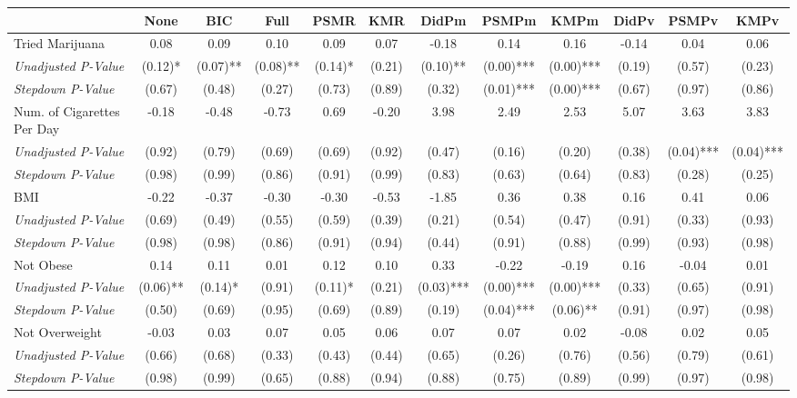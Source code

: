 \begin{tabular}{l c c c c c c c c c c c}
\toprule
 & None & BIC & Full & PSMR & KMR & DidPm & PSMPm & KMPm & DidPv & PSMPv & KMPv \\
\midrule
Tried Marijuana & 0.08 & 0.09 & 0.10 & 0.09 & 0.07 & -0.18 & 0.14 & 0.16 & -0.14 & 0.04 & 0.06 \\
\quad \textit{Unadjusted P-Value} & (0.12)* & (0.07)** & (0.08)** & (0.14)* & (0.21) & (0.10)** & (0.00)*** & (0.00)*** & (0.19) & (0.57) & (0.23) \\
\quad \textit{Stepdown P-Value} & (0.67) & (0.48) & (0.27) & (0.73) & (0.89) & (0.32) & (0.01)*** & (0.00)*** & (0.67) & (0.97) & (0.86) \\
Num. of Cigarettes Per Day & -0.18 & -0.48 & -0.73 & 0.69 & -0.20 & 3.98 & 2.49 & 2.53 & 5.07 & 3.63 & 3.83 \\
\quad \textit{Unadjusted P-Value} & (0.92) & (0.79) & (0.69) & (0.69) & (0.92) & (0.47) & (0.16) & (0.20) & (0.38) & (0.04)*** & (0.04)*** \\
\quad \textit{Stepdown P-Value} & (0.98) & (0.99) & (0.86) & (0.91) & (0.99) & (0.83) & (0.63) & (0.64) & (0.83) & (0.28) & (0.25) \\
BMI & -0.22 & -0.37 & -0.30 & -0.30 & -0.53 & -1.85 & 0.36 & 0.38 & 0.16 & 0.41 & 0.06 \\
\quad \textit{Unadjusted P-Value} & (0.69) & (0.49) & (0.55) & (0.59) & (0.39) & (0.21) & (0.54) & (0.47) & (0.91) & (0.33) & (0.93) \\
\quad \textit{Stepdown P-Value} & (0.98) & (0.98) & (0.86) & (0.91) & (0.94) & (0.44) & (0.91) & (0.88) & (0.99) & (0.93) & (0.98) \\
Not Obese & 0.14 & 0.11 & 0.01 & 0.12 & 0.10 & 0.33 & -0.22 & -0.19 & 0.16 & -0.04 & 0.01 \\
\quad \textit{Unadjusted P-Value} & (0.06)** & (0.14)* & (0.91) & (0.11)* & (0.21) & (0.03)*** & (0.00)*** & (0.00)*** & (0.33) & (0.65) & (0.91) \\
\quad \textit{Stepdown P-Value} & (0.50) & (0.69) & (0.95) & (0.69) & (0.89) & (0.19) & (0.04)*** & (0.06)** & (0.91) & (0.97) & (0.98) \\
Not Overweight & -0.03 & 0.03 & 0.07 & 0.05 & 0.06 & 0.07 & 0.07 & 0.02 & -0.08 & 0.02 & 0.05 \\
\quad \textit{Unadjusted P-Value} & (0.66) & (0.68) & (0.33) & (0.43) & (0.44) & (0.65) & (0.26) & (0.76) & (0.56) & (0.79) & (0.61) \\
\quad \textit{Stepdown P-Value} & (0.98) & (0.99) & (0.65) & (0.88) & (0.94) & (0.88) & (0.75) & (0.89) & (0.99) & (0.97) & (0.98) \\

\end{tabular}
